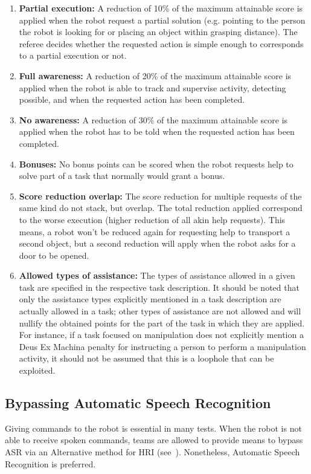 \begin{enumerate}
	\item \textbf{Partial execution:} A reduction of 10\% of the maximum attainable score is applied when the robot request a partial solution (e.g. pointing to the person the robot is looking for or placing an object within grasping distance).
	The referee decides whether the requested action is simple enough to corresponds to a partial execution or not.

	\item \textbf{Full awareness:} A reduction of 20\% of the maximum attainable score is applied when the robot is able to track and supervise activity, detecting possible, and when the requested action has been completed.

	\item \textbf{No awareness:} A reduction of 30\% of the maximum attainable score is applied when the robot has to be told when the requested action has been completed.

	\item \textbf{Bonuses:} No bonus points can be scored when the robot requests help to solve part of a task that normally would grant a bonus.

	\item \textbf{Score reduction overlap:} The score reduction for multiple requests of the same kind do not stack, but overlap.
	The total reduction applied correspond to the worse execution (higher reduction of all akin help requests).
	This means, a robot won't be reduced again for requesting help to transport a second object, but a second reduction will apply when the robot asks for a door to be opened.

	\item \textbf{Allowed types of assistance:} The types of assistance allowed in a given task are specified in the respective task description.
	It should be noted that only the assistance types explicitly mentioned in a task description are actually allowed in a task; other types of assistance are not allowed and will nullify the obtained points for the part of the task in which they are applied.
	For instance, if a task focused on manipulation does not explicitly mention a Deus Ex Machina penalty for instructing a person to perform a manipulation activity, it should not be assumed that this is a loophole that can be exploited.
\end{enumerate}

\subsection{Bypassing Automatic Speech Recognition}\label{rule:asrcontinue}
Giving commands to the robot is essential in many tests.
When the robot is not able to receive spoken commands, teams are allowed to provide means to bypass ASR via an Alternative method for HRI (see~).
Nonetheless, Automatic Speech Recognition is preferred.

